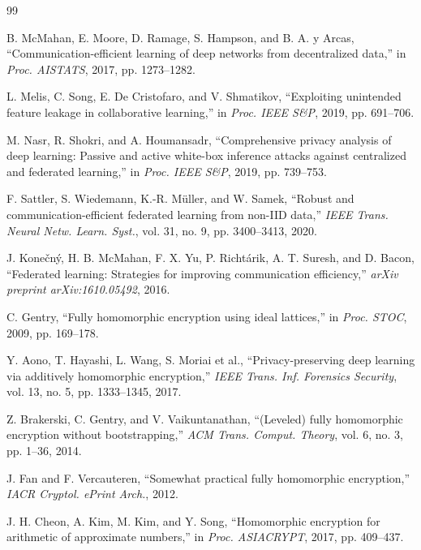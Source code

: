 \begin{thebibliography}{99}

B. McMahan, E. Moore, D. Ramage, S. Hampson, and B. A. y Arcas, ``Communication-efficient learning of deep networks from decentralized data,'' in \textit{Proc. AISTATS}, 2017, pp. 1273--1282.

L. Melis, C. Song, E. De Cristofaro, and V. Shmatikov, ``Exploiting unintended feature leakage in collaborative learning,'' in \textit{Proc. IEEE S\&P}, 2019, pp. 691--706.

M. Nasr, R. Shokri, and A. Houmansadr, ``Comprehensive privacy analysis of deep learning: Passive and active white-box inference attacks against centralized and federated learning,'' in \textit{Proc. IEEE S\&P}, 2019, pp. 739--753.

F. Sattler, S. Wiedemann, K.-R. M\"{u}ller, and W. Samek, ``Robust and communication-efficient federated learning from non-IID data,'' \textit{IEEE Trans. Neural Netw. Learn. Syst.}, vol. 31, no. 9, pp. 3400--3413, 2020.

J. Kone\v{c}n\'{y}, H. B. McMahan, F. X. Yu, P. Richt\'{a}rik, A. T. Suresh, and D. Bacon, ``Federated learning: Strategies for improving communication efficiency,'' \textit{arXiv preprint arXiv:1610.05492}, 2016.

C. Gentry, ``Fully homomorphic encryption using ideal lattices,'' in \textit{Proc. STOC}, 2009, pp. 169--178.

Y. Aono, T. Hayashi, L. Wang, S. Moriai et al., ``Privacy-preserving deep learning via additively homomorphic encryption,'' \textit{IEEE Trans. Inf. Forensics Security}, vol. 13, no. 5, pp. 1333--1345, 2017.

Z. Brakerski, C. Gentry, and V. Vaikuntanathan, ``(Leveled) fully homomorphic encryption without bootstrapping,'' \textit{ACM Trans. Comput. Theory}, vol. 6, no. 3, pp. 1--36, 2014.

J. Fan and F. Vercauteren, ``Somewhat practical fully homomorphic encryption,'' \textit{IACR Cryptol. ePrint Arch.}, 2012.

J. H. Cheon, A. Kim, M. Kim, and Y. Song, ``Homomorphic encryption for arithmetic of approximate numbers,'' in \textit{Proc. ASIACRYPT}, 2017, pp. 409--437.


\end{thebibliography}
